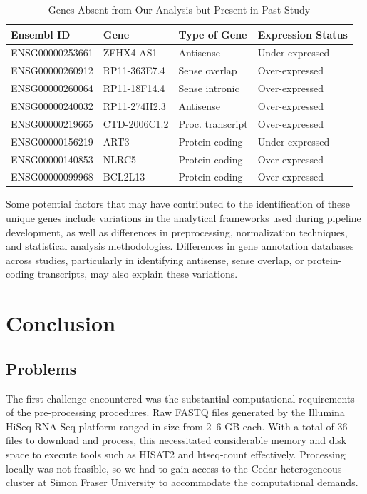 \documentclass{article}
\begin{document}
\begin{table}[H]
    \centering
    \begin{tabular}{llll}
        \toprule
        Ensembl ID          & Gene               & Type of Gene            & Expression Status         \\ 
        \midrule
        ENSG00000253661     & ZFHX4-AS1          & Antisense               & Under-expressed           \\ 
        ENSG00000260912     & RP11-363E7.4       & Sense overlap           & Over-expressed            \\ 
        ENSG00000260064     & RP11-18F14.4       & Sense intronic          & Over-expressed            \\ 
        ENSG00000240032     & RP11-274H2.3       & Antisense               & Over-expressed            \\ 
        ENSG00000219665     & CTD-2006C1.2       & Proc. transcript        & Over-expressed            \\ 
        ENSG00000156219     & ART3               & Protein-coding          & Under-expressed           \\ 
        ENSG00000140853     & NLRC5              & Protein-coding          & Over-expressed            \\ 
        ENSG00000099968     & BCL2L13            & Protein-coding          & Over-expressed            \\ 
        \bottomrule
    \end{tabular}
    \caption{Genes Absent from Our Analysis but Present in Past Study}
    \label{tab:absent_genes}
\end{table}

Some potential factors that may have contributed to the identification of these unique genes include variations in the analytical frameworks used during pipeline development, as well as differences in preprocessing, normalization techniques, and statistical analysis methodologies. Differences in gene annotation databases across studies, particularly in identifying antisense, sense overlap, or protein-coding transcripts, may also explain these variations.

\pagebreak

\section{Conclusion}
\subsection{Problems}
The first challenge encountered was the substantial computational requirements of the pre-processing procedures. Raw FASTQ files generated by the Illumina HiSeq RNA-Seq platform ranged in size from 2–6 GB each. With a total of 36 files to download and process, this necessitated considerable memory and disk space to execute tools such as HISAT2 and htseq-count effectively. Processing locally was not feasible, so we had to gain access to the  Cedar heterogeneous cluster at Simon Fraser University to accommodate the computational demands.
\end{document}
